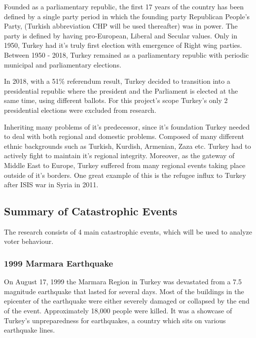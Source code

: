 \documentclass[12pt]{article}
\begin{document}
Founded as a parliamentary republic, the first 17 years of the country has been defined by a single party period in which the founding party Republican People's Party, (Turkish abbreviation CHP will be used thereafter) was in power. The party is defined by having pro-European, Liberal and Secular values. Only in 1950, Turkey had it's truly first election with emergence of Right wing parties. Between 1950 - 2018, Turkey remained as a parliamentary republic with periodic municipal and parliamentary elections.

In 2018, with a 51\% referendum result, Turkey decided to transition into a presidential republic where the president and the Parliament is elected at the same time, using different ballots. For this project's scope Turkey's only 2 presidential elections were excluded from research. 

Inheriting many problems of it's predecessor, since it's foundation Turkey needed to deal with both regional and domestic problems. Composed of many different ethnic backgrounds such as Turkish, Kurdish, Armenian, Zaza etc. Turkey had to actively fight to maintain it's regional integrity. Moreover, as the gateway of Middle East to Europe, Turkey suffered from many regional events taking place outside of it's borders. One great example of this is the refugee influx to Turkey after ISIS war in Syria in 2011. 

\subsection{Summary of Catastrophic Events}

The research consists of 4 main catastrophic events, which will be used to analyze voter behaviour. 

\subsubsection{1999 Marmara Earthquake}
On August 17, 1999 the Marmara Region in Turkey was devastated from a 7.5 magnitude earthquake that lasted for several days. Most of the buildings in the epicenter of the earthquake were either severely damaged or collapsed by the end of the event. Approximately 18,000 people were killed. It was a showcase of Turkey's unpreparedness for earthquakes, a country which sits on various earthquake lines.
\end{document}
